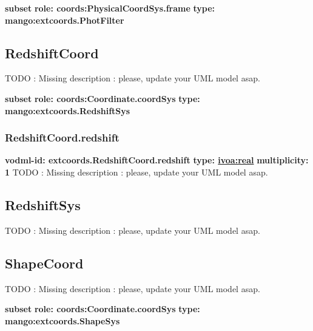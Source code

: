     \noindent \textbf{subset} \newline
    \indent   \textbf{role: coords:PhysicalCoordSys.frame} \newline
    \indent   \textbf{type:  mango:extcoords.PhotFilter} \newline


  \subsection{RedshiftCoord}
  \label{sect:extcoords.RedshiftCoord}
    TODO : Missing description : please, update your UML model asap.

    \noindent \textbf{subset} \newline
    \indent   \textbf{role: coords:Coordinate.coordSys} \newline
    \indent   \textbf{type:  mango:extcoords.RedshiftSys} \newline


    \subsubsection{RedshiftCoord.redshift}
      \textbf{vodml-id: extcoords.RedshiftCoord.redshift} \newline
      \textbf{type: \hyperref[sect:ivoa]{ivoa:real}} \newline
      \textbf{multiplicity: 1} \newline 
      TODO : Missing description : please, update your UML model asap.

  \subsection{RedshiftSys}
  \label{sect:extcoords.RedshiftSys}
    TODO : Missing description : please, update your UML model asap.

  \subsection{ShapeCoord}
  \label{sect:extcoords.ShapeCoord}
    TODO : Missing description : please, update your UML model asap.

    \noindent \textbf{subset} \newline
    \indent   \textbf{role: coords:Coordinate.coordSys} \newline
    \indent   \textbf{type:  mango:extcoords.ShapeSys} \newline


